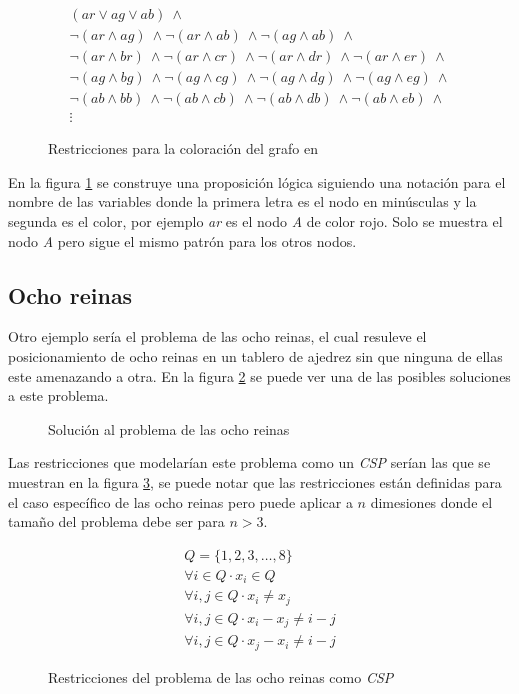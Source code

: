 \begin{figure}
\begin{align*}
    (ar \lor ag \lor ab)\ \land\\
    \neg(ar \land ag)\ \land \neg(ar \land ab)\ \land \neg(ag \land ab)\ \land\\
    \neg(ar \land br)\ \land \neg(ar \land cr)\ \land \neg(ar \land dr)\ \land \neg(ar \land er)\ \land\\
    \neg(ag \land bg)\ \land \neg(ag \land cg)\ \land \neg(ag \land dg)\ \land \neg(ag \land eg)\ \land\\
    \neg(ab \land bb)\ \land \neg(ab \land cb)\ \land \neg(ab \land db)\ \land \neg(ab \land eb)\ \land\\
    \vdots
\end{align*}
\caption{Restricciones para la coloración del grafo en \sat}
\label{fig:g_col_sat}
\end{figure}

En la figura \ref{fig:g_col_sat} se construye una proposición lógica siguiendo una notación para el nombre de las variables donde la primera letra es el nodo en minúsculas y la segunda es el color, por ejemplo \textit{ar} es el nodo \textit{A} de color rojo. Solo se muestra el nodo \textit{A} pero sigue el mismo patrón para los otros nodos.

\subsection{Ocho reinas}

Otro ejemplo sería el problema de las ocho reinas, el cual resuleve el posicionamiento de ocho reinas en un tablero de ajedrez sin que ninguna de ellas este amenazando a otra. En la figura \ref{fig:queens} se puede ver una de las posibles soluciones a este problema.

\begin{figure}
\centering
\newgame
{}
\showboard
\caption{Solución al problema de las ocho reinas}
\label{fig:queens}
\end{figure}

Las restricciones que modelarían este problema como un \textit{CSP} serían las que se muestran en la figura \ref{fig:queens_csp}, se puede notar que las restricciones están definidas para el caso específico de las ocho reinas pero puede aplicar a $n$ dimesiones donde el tamaño del problema debe ser para $n > 3$.

\begin{figure}
\begin{align*}
    Q = \{1, 2, 3, \dots, 8\}\\
    \forall i \in Q \cdot x_i \in Q\\
    \forall i,j \in Q \cdot x_i \neq x_j\\
    \forall i,j \in Q \cdot x_i - x_j \neq i - j\\
    \forall i,j \in Q \cdot x_j - x_i \neq i - j
\end{align*}
\caption{Restricciones del problema de las ocho reinas como \textit{CSP}}
\label{fig:queens_csp}
\end{figure}

